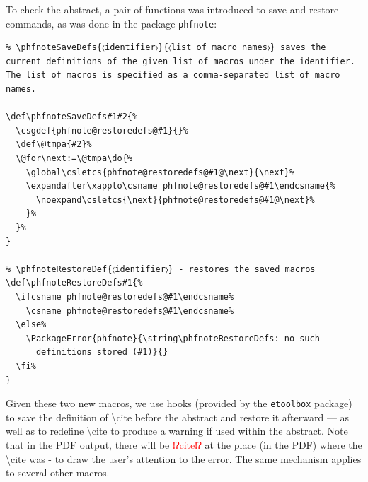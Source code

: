 \documentclass[12pt, twoside]{article}
\begin{document}

To check the abstract, a pair of functions was introduced to save and restore commands, as was done in the package \texttt{phfnote}:
\begin{lstlisting}[style=latexExampleForAuthors]
%% Macros from the package phfnote
% \phfnoteSaveDefs{〈identifier〉}{〈list of macro names〉} saves the current definitions of the given list of macros under the identifier. The list of macros is specified as a comma-separated list of macro names.

\def\phfnoteSaveDefs#1#2{%
  \csgdef{phfnote@restoredefs@#1}{}%
  \def\@tmpa{#2}%
  \@for\next:=\@tmpa\do{%
    \global\csletcs{phfnote@restoredefs@#1@\next}{\next}%
    \expandafter\xappto\csname phfnote@restoredefs@#1\endcsname{%
      \noexpand\csletcs{\next}{phfnote@restoredefs@#1@\next}%
    }%
  }%
}

% \phfnoteRestoreDef{〈identifier〉} - restores the saved macros
\def\phfnoteRestoreDefs#1{%
  \ifcsname phfnote@restoredefs@#1\endcsname%
    \csname phfnote@restoredefs@#1\endcsname%
  \else%
    \PackageError{phfnote}{\string\phfnoteRestoreDefs: no such
      definitions stored (#1)}{}
  \fi%
}
\end{lstlisting}

Given these two new macros, we use hooks (provided by the \texttt{etoolbox} package) to save the definition of \textbackslash cite before the abstract and restore it afterward --- as well as to redefine \textbackslash cite to produce a warning if used within the abstract. Note that in the \gls{PDF} output, there will be {\NotoSansFont \textcolor{red}{⁉cite⁉}} at the place (in the \gls{PDF}) where the \textbackslash cite was - to draw the user's attention to the error. The same mechanism applies to several other macros.
\end{document}
